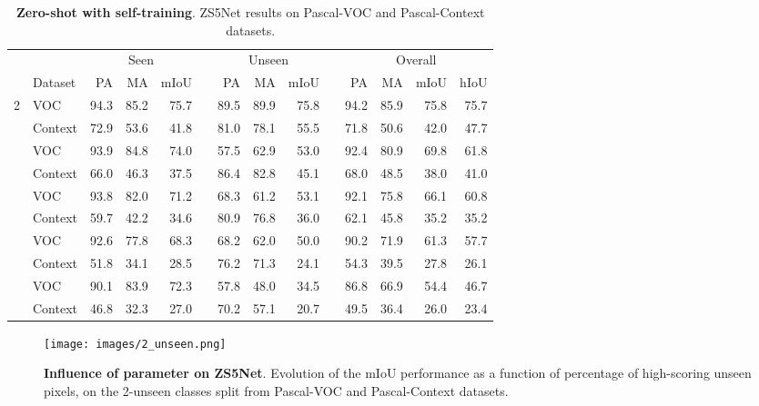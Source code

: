 \documentclass{article}
\begin{document}
\begin{table}
	\caption{\small \textbf{Zero-shot with self-training}. ZS5Net results on Pascal-VOC and Pascal-Context datasets.\vspace{3pt}}
	\small{
		\begin{tabular}{clrrrrrrrrrrrr} \toprule
			&                & \multicolumn{3}{c}{Seen} && \multicolumn{3}{c}{Unseen}  && \multicolumn{4}{c}{Overall}     \\ \cline{3-5} \cline{7-9} \cline{11-14}\noalign{\smallskip}
			 & Dataset           & PA    & MA    & mIoU  &&  PA    & MA    & mIoU && PA    &  MA     & mIoU  &  hIoU\\ \midrule[1.1pt] 
			\multirow{2}{*}{2}
			& VOC & 94.3   & 85.2   & 75.7  && 89.5 & 89.9  & 75.8  &&  94.2  & 85.9   & 75.8  & 75.7  \\
			& Context &  72.9  & 53.6  & 41.8 &&  81.0  & 78.1 & 55.5 && 71.8   & 50.6  & 42.0  & 47.7\\ \hline\noalign{\smallskip}
			\multirow{2}{*}{4} 
			 & VOC & 93.9 & 84.8 & 74.0 && 57.5 & 62.9  & 53.0 && 92.4  & 80.9  & 69.8 & 61.8 \\ 
		
				& Context &  66.0 & 46.3   & 37.5 &&  86.4 & 82.8   & 45.1 && 68.0    & 48.5   & 38.0 & 41.0\\ 
			\hline\noalign{\smallskip}
			\multirow{2}{*}{6} 
			& VOC & 93.8 & 82.0 & 71.2 && 68.3 & 61.2  & 53.1  &&  92.1 &  75.8 & 66.1 &  60.8\\ 
			& Context & 59.7  &  42.2 & 34.6 && 80.9 & 76.8 & 36.0 && 62.1 & 45.8 & 35.2 & 35.2 \\\hline\noalign{\smallskip}
			\multirow{2}{*}{8} 
			 & VOC & 92.6 & 77.8 & 68.3 && 68.2 & 62.0  & 50.0 &&  90.2 &  71.9 & 61.3 & 57.7 \\ 
			& Context &  51.8 & 34.1   & 28.5 && 76.2  &71.3 & 24.1 && 54.3    & 39.5   & 27.8  & 26.1 \\
			\hline\noalign{\smallskip}
			\multirow{2}{*}{10} 
			&  VOC & 90.1 & 83.9 & 72.3 && 57.8 & 48.0 & 34.5 &&  86.8 &  66.9 & 54.4 & 46.7 \\ 
			& Context  &  46.8  & 32.3 & 27.0  &&  70.2  & 57.1  & 20.7 && 49.5   & 36.4   & 26.0  & 23.4 \\ 
			\bottomrule
		\end{tabular}
	}
	\label{self_training}
\end{table}


\begin{SCfigure}[50][ht]
\centering
\texttt{[image: images/2\_unseen.png]}
\caption{\small \textbf{Influence of parameter  on ZS5Net}.  Evolution of the mIoU performance as a function of percentage of high-scoring unseen pixels, on the 2-unseen classes split from Pascal-VOC and Pascal-Context datasets.}
\vspace{-0.5cm}
\label{self_p}
\end{SCfigure}
\end{document}
